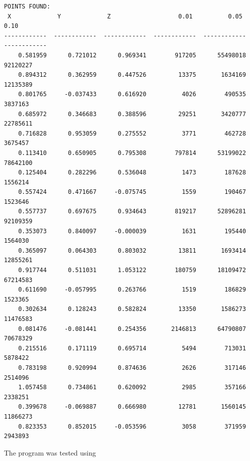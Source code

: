 \begin{verbatim}
POINTS FOUND:
 X             Y             Z                   0.01          0.05          0.10
------------  ------------  ------------  ------------  ------------  ------------
    0.581959      0.721012      0.969341        917205      55498018      92120227
    0.894312      0.362959      0.447526         13375       1634169      12135389
    0.801765     -0.037433      0.616920          4026        490535       3837163
    0.685972      0.346683      0.388596         29251       3420777      22785611
    0.716828      0.953059      0.275552          3771        462728       3675457
    0.113410      0.650905      0.795308        797814      53199022      78642100
    0.125404      0.282296      0.536048          1473        187628       1556214
    0.557424      0.471667     -0.075745          1559        190467       1523646
    0.557737      0.697675      0.934643        819217      52896281      92109359
    0.353073      0.840097     -0.000039          1631        195440       1564030
    0.365097      0.064303      0.803032         13811       1693414      12855261
    0.917744      0.511031      1.053122        180759      18109472      67214583
    0.611690     -0.057995      0.263766          1519        186829       1523365
    0.302634      0.128243      0.582824         13350       1586273      11476583
    0.081476     -0.081441      0.254356       2146813      64790807      70678329
    0.215516      0.171119      0.695714          5494        713031       5878422
    0.783198      0.920994      0.874636          2626        317146       2514096
    1.057458      0.734861      0.620092          2985        357166       2338251
    0.399678     -0.069887      0.666980         12781       1560145      11866273
    0.823353      0.852015     -0.053596          3058        371959       2943893
\end{verbatim}

The program was tested using 
